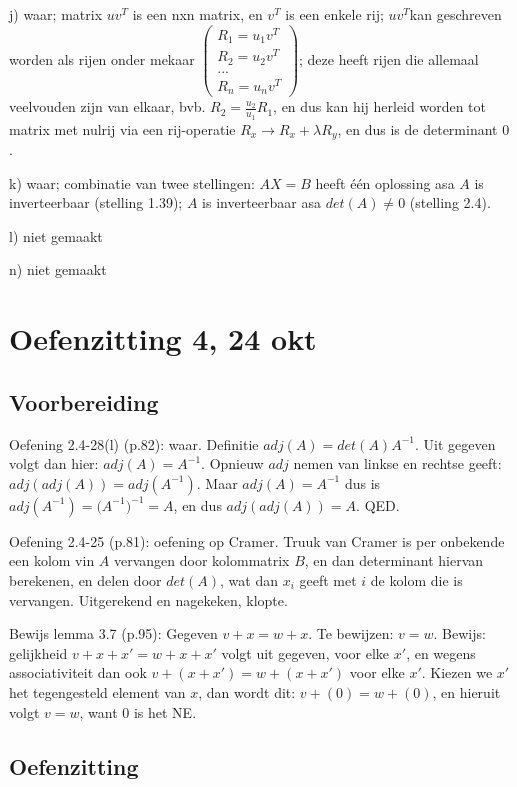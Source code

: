 \documentclass{article}
\begin{document}
j) waar; matrix $uv^T$ is een nxn matrix, en $v^T$ is een enkele rij;  $uv^T$kan geschreven worden als rijen onder mekaar $\begin{pmatrix}R_1=u_1v^T\\R_2=u_2v^T\\...\\R_n=u_nv^T\end{pmatrix}$; deze heeft rijen die allemaal veelvouden zijn van elkaar, bvb. $R_2 = \frac{u_2}{u_1}R_1$, en dus kan hij herleid worden tot matrix met nulrij via een rij-operatie $R_x \rightarrow R_x+\lambda R_y$, en dus is de determinant $0$. 

k) waar; combinatie van twee stellingen: $AX=B$ heeft \'e\'en oplossing asa $A$ is inverteerbaar (stelling 1.39); $A$ is inverteerbaar asa $det(A) \neq 0$ (stelling 2.4). 

l) niet gemaakt

n)  niet gemaakt 


\section{Oefenzitting 4, 24 okt}

\subsection {Voorbereiding}

Oefening 2.4-28(l) (p.82): waar. Definitie $adj(A) = det(A) A^{-1}$. Uit gegeven volgt dan hier: $adj(A) = A^{-1}$. Opnieuw $adj$ nemen van linkse en rechtse geeft: $adj(adj(A)) = adj(A^{-1})$. Maar $adj(A) = A^{-1}$ dus is $adj(A^{-1}) = {(A^{-1}})^{-1} = A$, en dus $adj(adj(A)) = A$. QED. 

Oefening 2.4-25 (p.81): oefening op Cramer. Truuk van Cramer is per onbekende een kolom vin $A$ vervangen door kolommatrix $B$, en dan determinant hiervan berekenen, en delen door $det(A)$, wat dan $x_i$ geeft met $i$ de kolom die is vervangen. Uitgerekend en nagekeken, klopte. 

Bewijs lemma 3.7 (p.95): Gegeven $v+x=w+x$. Te bewijzen: $v=w$. Bewijs: gelijkheid $v+x+x'=w+x+x'$ volgt uit gegeven, voor elke $x'$, en wegens associativiteit dan ook $v+(x+x')=w+(x+x')$ voor elke $x'$. Kiezen we $x'$ het tegengesteld element van $x$, dan wordt dit: $v+(0)=w+(0)$, en hieruit volgt $v=w$, want $0$ is het NE. 

\subsection {Oefenzitting}
\end{document}

